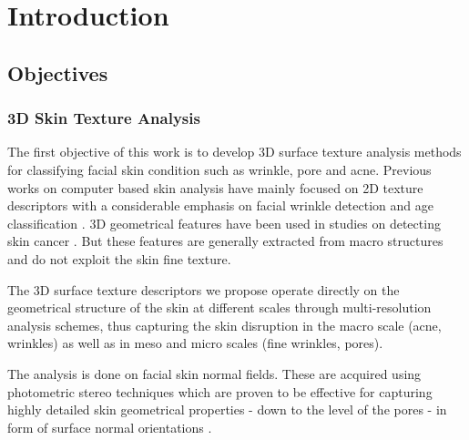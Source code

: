 
\chapter{Introduction} %

\label{Chapter1} %



\section{Objectives}

\subsection{3D Skin Texture Analysis}
The first objective of this work is to develop 3D surface texture analysis methods for classifying facial skin condition such as wrinkle, pore and acne. Previous works on computer based skin analysis have mainly focused on 2D texture descriptors with a considerable emphasis on facial wrinkle detection and age classification \cite{H.2001, V.V.2008}. 3D geometrical features have been used in studies on detecting skin cancer \cite{R.2010, J.S.;2012}. But these features are generally extracted from macro structures and do not exploit the skin fine texture.

The 3D surface texture descriptors we propose operate directly on the geometrical structure of the skin at different scales through multi-resolution analysis schemes, thus capturing the skin disruption in the macro scale (acne, wrinkles) as well as in meso and micro scales (fine wrinkles, pores).

The analysis is done on facial skin normal fields. These are acquired using photometric stereo techniques which are proven to be effective for capturing highly detailed skin geometrical properties - down to the level of the pores - in form of surface normal orientations \cite{P.2007, W.2008}. 

%


